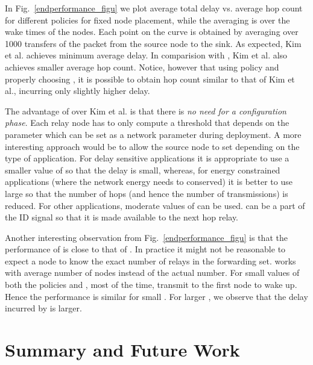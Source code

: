 \documentclass[onecolumn]{IEEEtran}
\begin{document}
In Fig.~\ref{endperformance_figu} we plot average total delay vs.
average hop count for different policies for fixed node placement, while the averaging is over the wake
times of the nodes. Each point on the curve is obtained by averaging  over 1000 transfers of the packet from the source node to the sink.
 As expected, Kim et al.  achieves minimum average delay.
In comparision with , Kim et al. also achieves smaller
average hop count. Notice, however that using  policy and properly choosing
, it is possible to obtain hop count similar to that of Kim et
al., incurring only slightly higher delay. 

The advantage of 
over Kim et al. is that there is \emph{no need for a configuration phase}.
Each relay node has to only compute a threshold that depends on the
parameter  which can be set as a network parameter during
deployment. A more interesting approach would be to allow the source
node to set  depending on the type of application. For delay
sensitive applications it is appropriate to use a smaller value of
 so that the delay is small, whereas, for energy constrained
applications (where the network energy needs to conserved) it is
better to use large  so that the number of hops (and
hence the number of transmissions) is reduced. For other applications, moderate
values of  can be used.  can be a part of the ID signal so
that it is made available to the next hop relay.

Another interesting observation from Fig.~\ref{endperformance_figu} is
that the performance of  is close to that of
. In practice it might not be reasonable to expect a node to
know the exact number of relays in the forwarding set.
 works with average number of nodes instead of the
actual number. For small values of  both the policies 
and , most of the time, transmit to the first node to
wake up.  Hence the performance is similar for small .  For
larger , we observe that the delay incurred by  is larger.

\section{Summary and Future Work}\label{conclusion}
\end{document}
